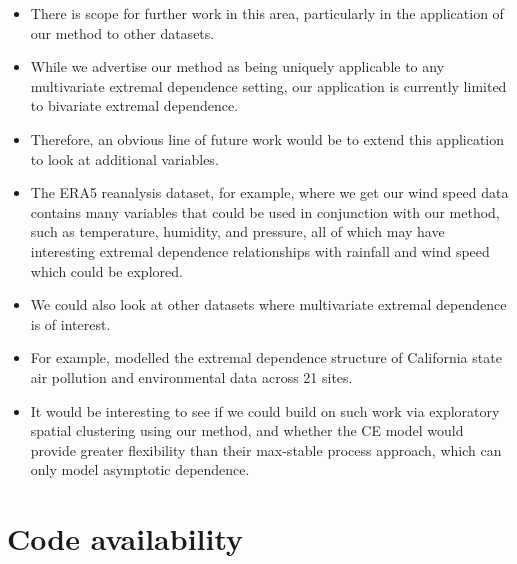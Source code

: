 \documentclass{article}
\numberwithin{equation}{section}
\begin{document}
\begin{itemize}
  \item There is scope for further work in this area, particularly in the application of our method to other datasets.
  \item While we advertise our method as being uniquely applicable to any multivariate extremal dependence setting, our application is currently limited to bivariate extremal dependence.
  \item Therefore, an obvious line of future work would be to extend this application to look at additional variables. 
  \item The ERA5 reanalysis dataset, for example, where we get our wind speed data contains many variables that could be used in conjunction with our method, such as temperature, humidity, and pressure, all of which may have interesting extremal dependence relationships with rainfall and wind speed which could be explored.
  \item We could also look at other datasets where multivariate extremal dependence is of interest. 
  \item For example, \citet{Vettori2020} modelled the extremal dependence structure of California state air pollution and environmental data across 21 sites. 
  \item It would be interesting to see if we could build on such work via exploratory spatial clustering using our method, and whether the CE model would provide greater flexibility than their max-stable process approach, which can only model asymptotic dependence. 
\end{itemize}

\section*{Code availability}

\newpage

\end{document}
